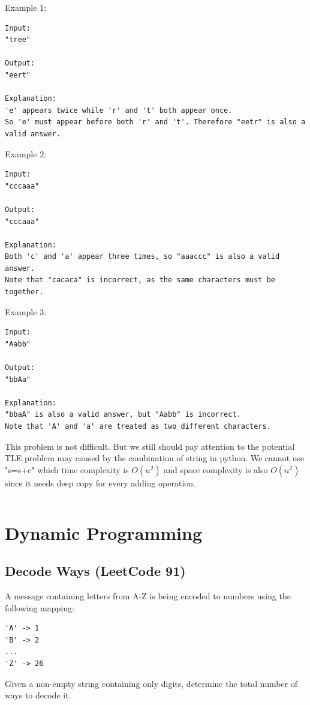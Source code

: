 \documentclass[11pt]{article}
\begin{document}
Example 1:
\begin{verbatim}
Input:
"tree"

Output:
"eert"

Explanation:
'e' appears twice while 'r' and 't' both appear once.
So 'e' must appear before both 'r' and 't'. Therefore "eetr" is also a valid answer.
\end{verbatim}


Example 2:
\begin{verbatim}
Input:
"cccaaa"

Output:
"cccaaa"

Explanation:
Both 'c' and 'a' appear three times, so "aaaccc" is also a valid answer.
Note that "cacaca" is incorrect, as the same characters must be together.
\end{verbatim}


Example 3:
\begin{verbatim}
Input:
"Aabb"

Output:
"bbAa"

Explanation:
"bbaA" is also a valid answer, but "Aabb" is incorrect.
Note that 'A' and 'a' are treated as two different characters.
\end{verbatim}

This problem is not difficult. 
But we still should pay attention to the potential TLE problem may caused by the combination of string in python. 
We cannot use "s=s+c" which time complexity is $O(n^2)$ and space complexity is also $O(n^2)$ since it needs deep copy for every adding operation.

\inputminted[breaklines=true,frame=leftline, linenos=true]{python}{src/frequencySort.py}

\section{Dynamic Programming}

\subsection{Decode Ways (LeetCode 91)}
A message containing letters from A-Z is being encoded to numbers using the following mapping:
\begin{verbatim}
'A' -> 1
'B' -> 2
...
'Z' -> 26	
\end{verbatim}
Given a non-empty string containing only digits, determine the total number of ways to decode it.
\end{document}
